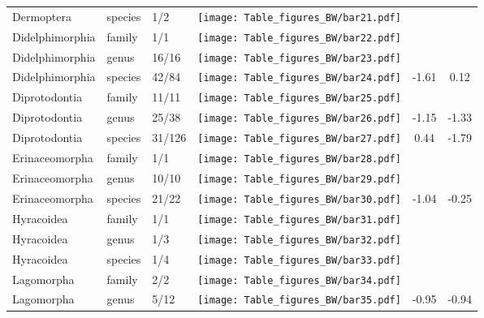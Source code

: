 \begin{longtable}{lL{1.8cm}C{2cm}lcc}
  Dermoptera & species & 1/2 & \texttt{[image: Table\_figures\_BW/bar21.pdf]} &   &   \\ 
  Didelphimorphia & family & 1/1 & \texttt{[image: Table\_figures\_BW/bar22.pdf]} &   &   \\ 
  Didelphimorphia & genus & 16/16 & \texttt{[image: Table\_figures\_BW/bar23.pdf]} &   &   \\ 
  Didelphimorphia & species & 42/84 & \texttt{[image: Table\_figures\_BW/bar24.pdf]} & -1.61 & 0.12 \\ 
  Diprotodontia & family & 11/11 & \texttt{[image: Table\_figures\_BW/bar25.pdf]} &   &   \\ 
  Diprotodontia & genus & 25/38 & \texttt{[image: Table\_figures\_BW/bar26.pdf]} & -1.15 & -1.33 \\ 
  Diprotodontia & species & 31/126 & \texttt{[image: Table\_figures\_BW/bar27.pdf]} & 0.44 & -1.79 \\ 
  Erinaceomorpha & family & 1/1 & \texttt{[image: Table\_figures\_BW/bar28.pdf]} &   &   \\ 
  Erinaceomorpha & genus & 10/10 & \texttt{[image: Table\_figures\_BW/bar29.pdf]} &   &   \\ 
  Erinaceomorpha & species & 21/22 & \texttt{[image: Table\_figures\_BW/bar30.pdf]} & -1.04 & -0.25 \\ 
  Hyracoidea & family & 1/1 & \texttt{[image: Table\_figures\_BW/bar31.pdf]} &   &   \\ 
  Hyracoidea & genus & 1/3 & \texttt{[image: Table\_figures\_BW/bar32.pdf]} &   &   \\ 
  Hyracoidea & species & 1/4 & \texttt{[image: Table\_figures\_BW/bar33.pdf]} &   &   \\ 
  Lagomorpha & family & 2/2 & \texttt{[image: Table\_figures\_BW/bar34.pdf]} &   &   \\ 
  Lagomorpha & genus & 5/12 & \texttt{[image: Table\_figures\_BW/bar35.pdf]} & -0.95 & -0.94 \\ 

\end{longtable}
